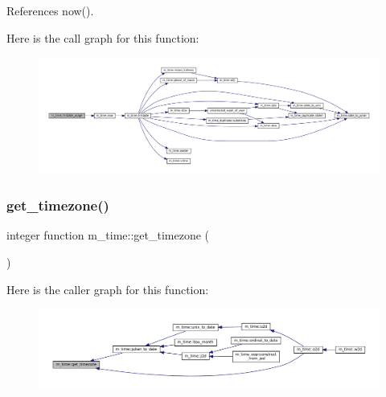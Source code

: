 References now().

Here is the call graph for this function\+:\nopagebreak
\begin{figure}[H]
\begin{center}
\leavevmode
\includegraphics[width=350pt]{namespacem__time_a914927f70fb9495af1be2e484b967111_cgraph}
\end{center}
\end{figure}
\mbox{\label{namespacem__time_a7903410a1d28bcdf3d33ab0c2d74b124}} 
\subsubsection{\texorpdfstring{get\+\_\+timezone()}{get\_timezone()}}
{\footnotesize\ttfamily integer function m\+\_\+time\+::get\+\_\+timezone (\begin{DoxyParamCaption}{ }\end{DoxyParamCaption})\hspace{0.3cm}{\ttfamily [private]}}

Here is the caller graph for this function\+:
\nopagebreak
\begin{figure}[H]
\begin{center}
\leavevmode
\includegraphics[width=350pt]{namespacem__time_a7903410a1d28bcdf3d33ab0c2d74b124_icgraph}
\end{center}
\end{figure}
\mbox{\label{namespacem__time_aa5198c7aa4f3d8411c8ce93046ce3794}} 
